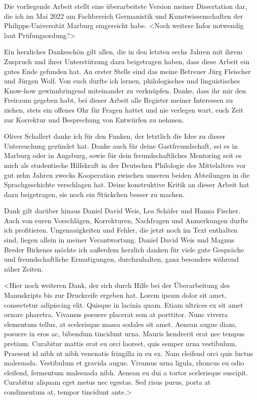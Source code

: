 \addchap{\lsPrefaceTitle}

Die vorliegende Arbeit stellt eine überarbeitete Version meiner Dissertation
dar, die ich im Mai 2022 am Fachbereich Germanistik und Kunstwissenschaften der
Philipps-Universität Marburg eingereicht habe. <Noch weitere Infos notwendig
laut Prüfungsordung?>
 
Ein herzliches Dankeschön gilt allen, die in den letzten sechs Jahren mit ihrem
Zuspruch und ihrer Unterstützung dazu beigetragen haben, dass diese Arbeit ein
gutes Ende gefunden hat. An erster Stelle sind das meine Betreuer Jürg
Fleischer und Jürgen Wolf. Von euch durfte ich lernen, philologisches und
linguistisches Know-how gewinnbringend miteinander zu verknüpfen. Danke, dass
ihr mir den Freiraum gegeben habt, bei dieser Arbeit alle Register meiner
Interessen zu ziehen, stets ein offenes Ohr für Fragen hattet und nie verlegen
wart, euch Zeit zur Korrektur und Besprechung von Entwürfen zu nehmen.

Oliver Schallert danke ich für den Funken, der letztlich die Idee zu dieser
Untersuchung gezündet hat. Danke auch für deine Gastfreundschaft, sei es in
Marburg oder in Augsburg, sowie für dein freundschaftliches Mentoring seit es
mich als studentische Hilfskraft in der Deutschen Philologie des Mittelalters
vor gut zehn Jahren zwecks Kooperation zwischen unseren beiden Abteilungen in
die Sprachgeschichte verschlagen hat. Deine konstruktive Kritik an dieser
Arbeit hat dazu beigetragen, sie noch ein Stückchen besser zu machen.

Dank gilt darüber hinaus Daniel David Weis, Lea Schäfer und Hanna Fischer. Auch
von euren Vorschlägen, Korrekturen, Nachfragen und Anmerkungen durfte ich
profitieren. Ungenauigkeiten und Fehler, die jetzt noch im Text enthalten sind,
liegen allein in meiner Verantwortung. Daniel David Weis und Magnus Breder
Birkenes möchte ich außerdem herzlich danken für viele gute Gespräche und
freundschaftliche Ermutigungen, durchzuhalten, ganz besonders während zäher
Zeiten.

<Hier noch weiteren Dank, der sich durch Hilfe bei der Überarbeitung des
Manuskripts bis zur Druckreife ergeben hat. Lorem ipsum dolor sit amet,
consectetur adipiscing elit. Quisque in lacinia quam. Etiam ultrices ex sit
amet ornare pharetra. Vivamus posuere placerat sem at porttitor. Nunc viverra
elementum tellus, at scelerisque massa sodales sit amet. Aenean augue diam,
posuere in eros ac, bibendum tincidunt urna. Mauris hendrerit erat nec tempus
pretium. Curabitur mattis erat eu orci laoreet, quis semper urna vestibulum.
Praesent id nibh ut nibh venenatis fringilla in eu ex. Nam eleifend orci quis
luctus malesuada. Vestibulum et gravida augue. Vivamus urna ligula, rhoncus eu
odio eleifend, fermentum malesuada nibh. Aenean eu dui a tortor scelerisque
suscipit. Curabitur aliquam eget metus nec egestas. Sed risus purus, porta at
condimentum at, tempor tincidunt ante.>

